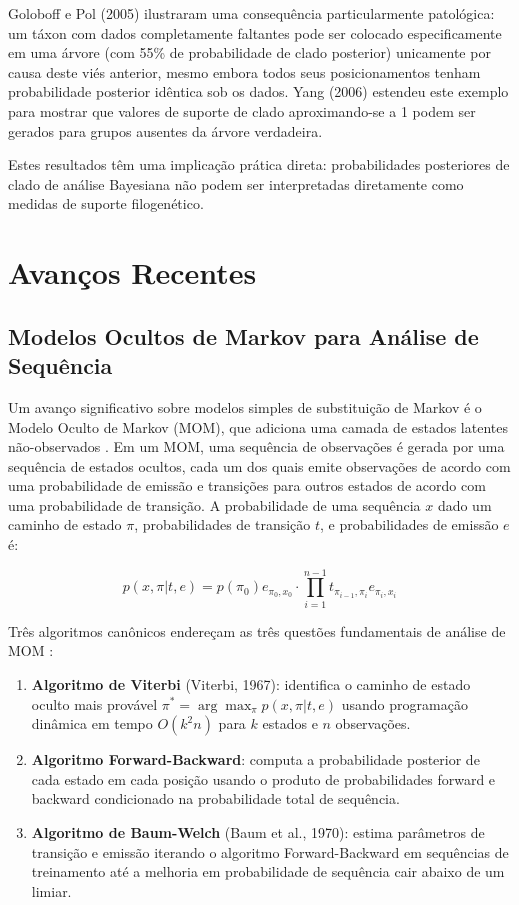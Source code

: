Goloboff e Pol (2005) ilustraram uma consequência particularmente patológica: um táxon com dados completamente faltantes pode ser colocado especificamente em uma árvore (com 55\% de probabilidade de clado posterior) unicamente por causa deste viés anterior, mesmo embora todos seus posicionamentos tenham probabilidade posterior idêntica sob os dados. Yang (2006) estendeu este exemplo para mostrar que valores de suporte de clado aproximando-se a 1 podem ser gerados para grupos ausentes da árvore verdadeira.

Estes resultados têm uma implicação prática direta: probabilidades posteriores de clado de análise Bayesiana não podem ser interpretadas diretamente como medidas de suporte filogenético.

\section{Avanços Recentes}

\subsection{Modelos Ocultos de Markov para Análise de Sequência}

Um avanço significativo sobre modelos simples de substituição de Markov é o Modelo Oculto de Markov (MOM), que adiciona uma camada de estados latentes não-observados \parencite{wheeler2012}. Em um MOM, uma sequência de observações é gerada por uma sequência de estados ocultos, cada um dos quais emite observações de acordo com uma probabilidade de emissão e transições para outros estados de acordo com uma probabilidade de transição. A probabilidade de uma sequência $x$ dado um caminho de estado $\pi$, probabilidades de transição $t$, e probabilidades de emissão $e$ é:

$$p(x, \pi|t, e) = p(\pi_0) e_{\pi_0, x_0} \cdot \prod_{i=1}^{n-1} t_{\pi_{i-1}, \pi_i} e_{\pi_i, x_i}$$

Três algoritmos canônicos endereçam as três questões fundamentais de análise de MOM \parencite{wheeler2012}:

\begin{enumerate}
    \item \textbf{Algoritmo de Viterbi} (Viterbi, 1967): identifica o caminho de estado oculto mais provável $\pi^* = \arg\max_\pi p(x, \pi|t, e)$ usando programação dinâmica em tempo $O(k^2 n)$ para $k$ estados e $n$ observações.

    \item \textbf{Algoritmo Forward-Backward}: computa a probabilidade posterior de cada estado em cada posição usando o produto de probabilidades forward e backward condicionado na probabilidade total de sequência.

    \item \textbf{Algoritmo de Baum-Welch} (Baum et al., 1970): estima parâmetros de transição e emissão iterando o algoritmo Forward-Backward em sequências de treinamento até a melhoria em probabilidade de sequência cair abaixo de um limiar.
\end{enumerate}

